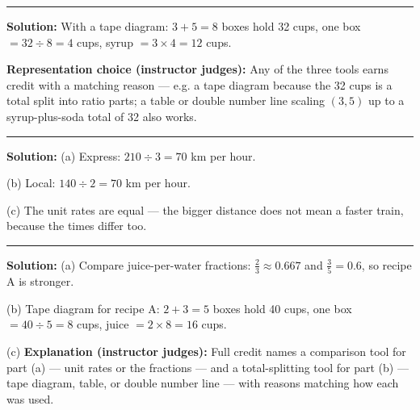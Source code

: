 \documentclass[12pt]{article}
\begin{document}
\vspace{0.3cm}\noindent\rule{\linewidth}{0.2pt}\vspace{0.3cm}


\textbf{Solution:} With a tape diagram: $3 + 5 = 8$ boxes hold 32 cups, one box
$= 32 \div 8 = 4$ cups, syrup $= 3 \times 4 = 12$ cups. 

\textbf{Representation choice (instructor judges):} Any of the three tools earns
credit with a matching reason — e.g. a tape diagram because the 32 cups is a
total split into ratio parts; a table or double number line scaling $(3,5)$ up
to a syrup-plus-soda total of 32 also works.

\vspace{0.3cm}\noindent\rule{\linewidth}{0.2pt}\vspace{0.3cm}


\textbf{Solution:} (a) Express: $210 \div 3 = 70$ km per hour. 

(b) Local: $140 \div 2 = 70$ km per hour. 

(c) The unit rates are equal — the bigger distance does not mean a faster
train, because the times differ too. 

\vspace{0.3cm}\noindent\rule{\linewidth}{0.2pt}\vspace{0.3cm}


\textbf{Solution:} (a) Compare juice-per-water fractions:
$\frac{2}{3} \approx 0.667$ and $\frac{3}{5} = 0.6$, so recipe A is
stronger. 

(b) Tape diagram for recipe A: $2 + 3 = 5$ boxes hold 40 cups, one box $=
40 \div 5 = 8$ cups, juice $= 2 \times 8 = 16$ cups. 

(c) \textbf{Explanation (instructor judges):} Full credit names a comparison
tool for part (a) — unit rates or the fractions — and a total-splitting tool
for part (b) — tape diagram, table, or double number line — with reasons
matching how each was used.
\end{document}

